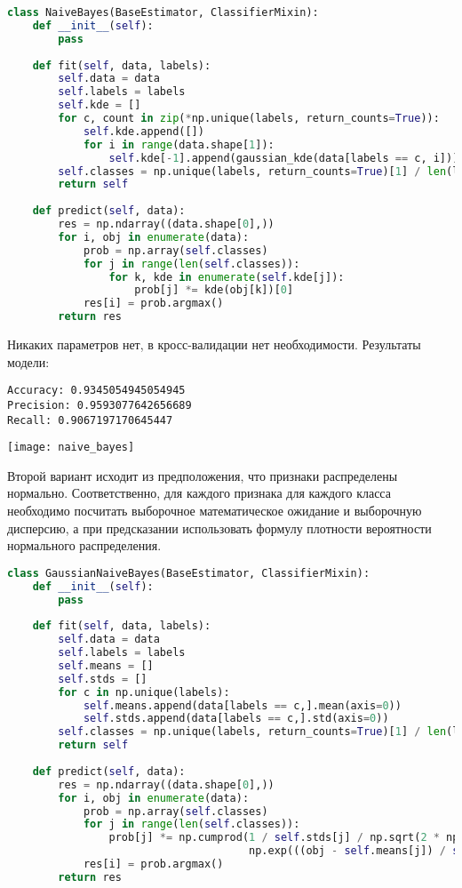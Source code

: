 \begin{lstlisting}[language=python, keepspaces=true]
class NaiveBayes(BaseEstimator, ClassifierMixin):
    def __init__(self):
        pass
    
    def fit(self, data, labels):
        self.data = data
        self.labels = labels
        self.kde = []
        for c, count in zip(*np.unique(labels, return_counts=True)):
            self.kde.append([])
            for i in range(data.shape[1]):
                self.kde[-1].append(gaussian_kde(data[labels == c, i]))
        self.classes = np.unique(labels, return_counts=True)[1] / len(labels)
        return self
    
    def predict(self, data):
        res = np.ndarray((data.shape[0],))
        for i, obj in enumerate(data):
            prob = np.array(self.classes)
            for j in range(len(self.classes)):
                for k, kde in enumerate(self.kde[j]):
                    prob[j] *= kde(obj[k])[0]
            res[i] = prob.argmax()
        return res
\end{lstlisting}

Никаких параметров нет, в кросс-валидации нет необходимости. Результаты модели:

\begin{lstlisting}[frame=none, numbers=none]
Accuracy: 0.9345054945054945
Precision: 0.9593077642656689
Recall: 0.9067197170645447
\end{lstlisting}
\texttt{[image: naive\_bayes]}

Второй вариант исходит из предположения, что признаки распределены нормально. Соответственно, для каждого признака для каждого класса необходимо посчитать выборочное математическое ожидание и выборочную дисперсию, а при предсказании использовать формулу плотности вероятности нормального распределения.

\begin{lstlisting}[language=python, keepspaces=true]
class GaussianNaiveBayes(BaseEstimator, ClassifierMixin):
    def __init__(self):
        pass
    
    def fit(self, data, labels):
        self.data = data
        self.labels = labels
        self.means = []
        self.stds = []
        for c in np.unique(labels):
            self.means.append(data[labels == c,].mean(axis=0))
            self.stds.append(data[labels == c,].std(axis=0))
        self.classes = np.unique(labels, return_counts=True)[1] / len(labels)
        return self
    
    def predict(self, data):
        res = np.ndarray((data.shape[0],))
        for i, obj in enumerate(data):
            prob = np.array(self.classes)
            for j in range(len(self.classes)):
                prob[j] *= np.cumprod(1 / self.stds[j] / np.sqrt(2 * np.pi) * 
                                      np.exp(((obj - self.means[j]) / self.stds[j]) ** 2 / -2))[-1]
            res[i] = prob.argmax()
        return res
\end{lstlisting}

